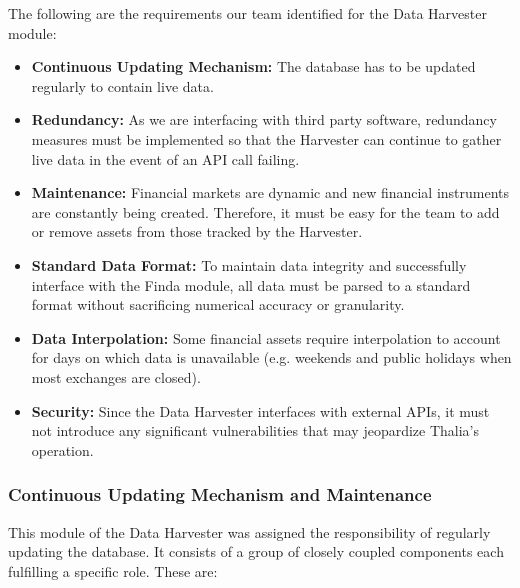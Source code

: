 \documentclass[main.tex]{subfiles}
\begin{document}
The following are the requirements our team identified for the Data Harvester module:

\begin{itemize}
    \item \textbf{Continuous Updating Mechanism:} The database has to be updated regularly to contain live data.
    \item \textbf{Redundancy:} As we are interfacing with third party software, redundancy measures must be implemented so that the Harvester can continue to gather live data in the event of an API call failing.
    \item \textbf{Maintenance:} Financial markets are dynamic and new financial instruments are constantly being created. Therefore, it must be easy for the team to add or remove assets from those tracked by the Harvester.
    \item \textbf{Standard Data Format:} To maintain data integrity and successfully interface with the Finda module, all data must be parsed to a standard format without sacrificing numerical accuracy or granularity.
    \item \textbf{Data Interpolation:} Some financial assets require interpolation to account for days on which data is unavailable (e.g. weekends and public holidays when most exchanges are closed).
    \item \textbf{Security:} Since the Data Harvester interfaces with external APIs, it must not introduce any significant vulnerabilities that may jeopardize Thalia's operation.
\end{itemize}

\subsubsection{Continuous Updating Mechanism and Maintenance}
This module of the Data Harvester was assigned the responsibility of regularly updating the database. It consists of a group of closely coupled components each fulfilling a specific role. These are:
\end{document}
